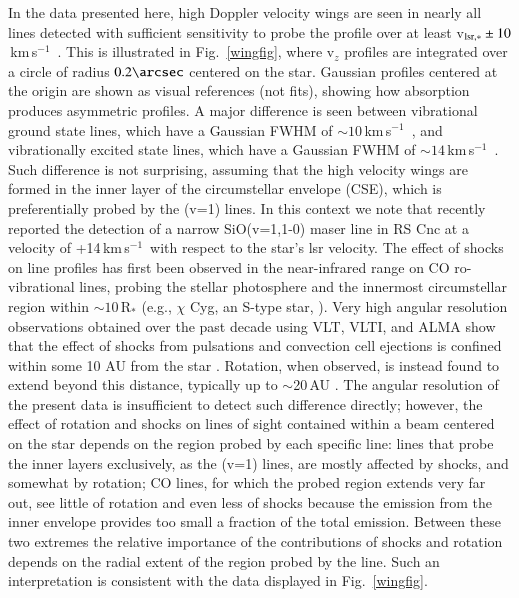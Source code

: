 \documentclass{aa}
\newcommand{\kms}{\,km\,s$^{-1}$~}
\begin{document}
In the data presented here, high Doppler velocity wings are seen in
nearly all lines detected with sufficient sensitivity to probe the
profile over at least v$_{\rm lsr,*}\pm10$\kms. This is illustrated in
Fig.~\ref{wingfig}, where v$_z$ profiles are integrated over a circle
of  radius $0.2\arcsec$ centered on the star. Gaussian profiles
centered at the origin are shown as visual references (not fits),
showing how absorption produces asymmetric profiles.  A major
difference is seen between vibrational ground state lines, which have
a Gaussian FWHM of $\sim 10$\kms, and vibrationally excited state
lines, which have a Gaussian FWHM of $\sim14$\kms. Such difference is
not  surprising, assuming that the high velocity wings are formed in
the inner layer of the circumstellar envelope (CSE), which is
preferentially probed by the (v=1) lines. In this context we note that
\citet{rcg2021} recently reported the detection of a narrow
SiO(v=1,1-0) maser line in RS Cnc at a velocity of +14\kms with
respect to the star's lsr velocity.  The effect of shocks on line
profiles has first been observed in the near-infrared range on CO
ro-vibrational lines, probing the stellar photosphere and the
innermost circumstellar region within $\sim 10$\,R$_*$ (e.g., $\chi$
Cyg, an S-type star, \cite{hhr82}). Very high angular resolution
observations obtained over the past decade using VLT, VLTI, and ALMA
show that the effect of shocks from pulsations and convection cell
ejections is confined within some 10 AU from the star  \citep[see, for
example,][and references
therein]{2018A&A...620A..75K,ho18,2019ApJ...883...89O}.  Rotation,
when observed, is instead found to extend beyond this distance,
typically up to $\sim$20\,AU
\citep[e.g.,][]{2018A&A...613L...4V,hdtetal2018,nhungetal2021}.  The
angular resolution of the present data is insufficient to detect such
difference directly; however, the effect of rotation and shocks on
lines of sight contained within a beam centered on the star depends on
the region probed by each specific line: lines that probe the inner
layers exclusively, as the (v=1) lines, are mostly affected by shocks,
and somewhat by rotation; CO lines, for which the probed region
extends very far out, see little of rotation and even less of shocks
because the emission from the inner envelope provides too small a
fraction of the total emission. Between these two extremes the
relative importance of the contributions of shocks and rotation
depends on the radial extent of the region probed by the line. Such an
interpretation is consistent with the data displayed in
Fig.~\ref{wingfig}.
\end{document}
